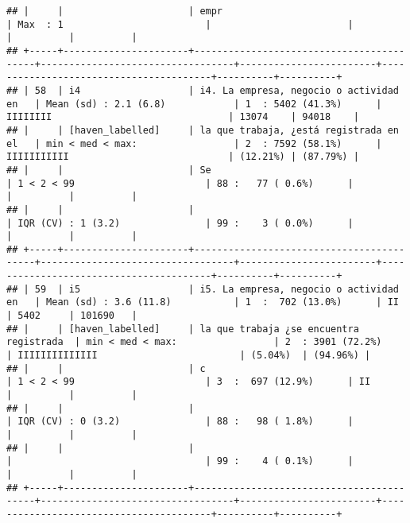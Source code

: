 \documentclass[]{article}
\begin{document}
\begin{verbatim}
## |     |                      | empr                                     | Max  : 1                         |                        |                                        |          |          |
## +-----+----------------------+------------------------------------------+----------------------------------+------------------------+----------------------------------------+----------+----------+
## | 58  | i4                   | i4. La empresa, negocio o actividad en   | Mean (sd) : 2.1 (6.8)            | 1  : 5402 (41.3%)      | IIIIIIII                               | 13074    | 94018    |
## |     | [haven_labelled]     | la que trabaja, ¿está registrada en el   | min < med < max:                 | 2  : 7592 (58.1%)      | IIIIIIIIIII                            | (12.21%) | (87.79%) |
## |     |                      | Se                                       | 1 < 2 < 99                       | 88 :   77 ( 0.6%)      |                                        |          |          |
## |     |                      |                                          | IQR (CV) : 1 (3.2)               | 99 :    3 ( 0.0%)      |                                        |          |          |
## +-----+----------------------+------------------------------------------+----------------------------------+------------------------+----------------------------------------+----------+----------+
## | 59  | i5                   | i5. La empresa, negocio o actividad en   | Mean (sd) : 3.6 (11.8)           | 1  :  702 (13.0%)      | II                                     | 5402     | 101690   |
## |     | [haven_labelled]     | la que trabaja ¿se encuentra registrada  | min < med < max:                 | 2  : 3901 (72.2%)      | IIIIIIIIIIIIII                         | (5.04%)  | (94.96%) |
## |     |                      | c                                        | 1 < 2 < 99                       | 3  :  697 (12.9%)      | II                                     |          |          |
## |     |                      |                                          | IQR (CV) : 0 (3.2)               | 88 :   98 ( 1.8%)      |                                        |          |          |
## |     |                      |                                          |                                  | 99 :    4 ( 0.1%)      |                                        |          |          |
## +-----+----------------------+------------------------------------------+----------------------------------+------------------------+----------------------------------------+----------+----------+

\end{verbatim}
\end{document}
